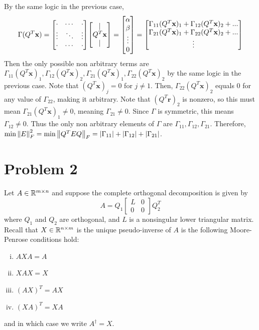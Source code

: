\begin{solution}
\begin{enumerate}
        By the same logic in the previous case, 
        \[
        \Gamma (Q^T\textbf{x}) = \mqty[\cdot &\cdots &\cdot\\ \vdots &\ddots &\vdots\\ \cdot &\cdots &\cdot]\mqty[\vert \\ Q^T\textbf{x} \\ \vert] = \mqty[\alpha \\ \beta\\\vdots\\0] = \mqty [\Gamma_{11}(Q^T\textbf{x})_1 + \Gamma_{12}(Q^T\textbf{x})_2 + ...\\ \Gamma_{21}(Q^T\textbf{x})_1 + \Gamma_{22}(Q^T\textbf{x})_2 + ...\\ \vdots]
        \]
        Then the only possible non arbitrary terms are $\Gamma_{11}(Q^T\textbf{x})_1, \Gamma_{12}(Q^T\textbf{x})_2, \Gamma_{21}(Q^T\textbf{x})_1, \Gamma_{22}(Q^T\textbf{x})_2$ by the same logic in the previous case. Note that $(Q^T\textbf{x})_j = 0$ for $j \neq 1$. Then, $\Gamma_{22}(Q^T\textbf{x})_2$ equals 0 for any value of $\Gamma_{22}$, making it arbitrary. Note that $(Q^T\textbf{r})_2$ is nonzero, so this must mean $\Gamma_{21}(Q^T\textbf{x})_1 \neq 0$, meaning $\Gamma_{21} \neq 0$. Since $\Gamma$ is symmetric, this means $\Gamma_{12} \neq 0$. Thus the only non arbitrary elements of $\Gamma$ are $\Gamma_{11}, \Gamma_{12}, \Gamma_{21}$. Therefore, $\min \norm{E}_F^2 = \min \norm{Q^TEQ}_F = |\Gamma_{11}| + |\Gamma_{12}| + |\Gamma_{21}|$.   
        
    \end{enumerate}
\end{solution}


\newpage
\section{Problem 2}
Let $A \in \mathbb{R}^{m \times n}$ and suppose the complete orthogonal decomposition is given by
\[
A = Q_1 \begin{bmatrix}L &0\\0&0\end{bmatrix}Q_2^T
\]
where $Q_1$ and $Q_2$ are orthogonal, and $L$ is a nonsingular lower triangular matrix. Recall that $X \in \mathbb{R}^{n \times m}$ is the unique pseudo-inverse of $A$ is the following Moore-Penrose conditions hold:
\begin{enumerate}[(i)]
    \item $AXA = A$ 
    \item $XAX = X$ 
    \item $(AX)^T = AX$ 
    \item $(XA)^T = XA$
\end{enumerate}
and in which case we write $A^\dag = X$.
